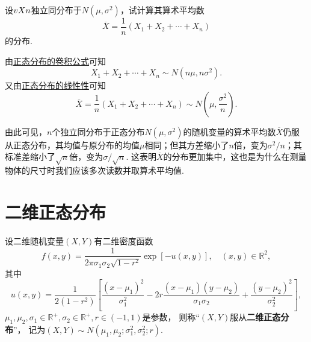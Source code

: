 \begin{example}
设\(v{X}{n}\)独立同分布于\(N(\mu,\sigma^2)\)，试计算其算术平均数\[
\overline{X} = \frac{1}{n} (X_1+X_2+\dotsb+X_n)
\]的分布.
\begin{solution}
由\hyperref[theorem:正态分布与自然指数分布族.正态分布的可加性2]{正态分布的卷积公式}可知\[
X_1+X_2+\dotsb+X_n \sim N(n\mu,n\sigma^2).
\]又由\hyperref[theorem:正态分布与自然指数分布族.正态分布的线性性质]{正态分布的线性性}可知\[
\overline{X} = \frac{1}{n} (X_1+X_2+\dotsb+X_n) \sim N\left(\mu,\frac{\sigma^2}{n}\right).
\]
\end{solution}
由此可见，\(n\)个独立同分布于正态分布\(N(\mu,\sigma^2)\)的随机变量的算术平均数\(\overline{X}\)仍服从正态分布，其均值与原分布的均值\(\mu\)相同；但其方差缩小了\(n\)倍，变为\(\sigma^2/n\)；其标准差缩小了\(\sqrt{n}\)倍，变为\(\sigma/\sqrt{n}\).
这表明\(\overline{X}\)的分布更加集中，这也是为什么在测量物体的尺寸时我们应该多次读数并取算术平均值.
\end{example}

\section{二维正态分布}
\begin{definition}
设二维随机变量\((X,Y)\)有二维密度函数\begin{equation}
f(x,y) = \frac{1}{2\pi\sigma_1\sigma_2\sqrt{1-r^2}} \exp[- u(x,y)],
\quad(x,y)\in\mathbb{R}^2,
\end{equation}
其中\[
u(x,y)
= \frac{1}{2(1-r^2)} \left[
		\frac{(x-\mu_1)^2}{\sigma_1^2}
		-2r\frac{(x-\mu_1)(y-\mu_2)}{\sigma_1\sigma_2}
		+\frac{(y-\mu_2)^2}{\sigma_2^2}
	\right],
\]\(\mu_1,\mu_2,\sigma_1\in\mathbb{R}^+,\sigma_2\in\mathbb{R}^+,r\in(-1,1)\)是参数，%
则称“\((X,Y)\)服从\textbf{二维正态分布}”，%
记为\((X,Y) \sim N(\mu_1,\mu_2;\sigma_1^2,\sigma_2^2;r)\).
\end{definition}

